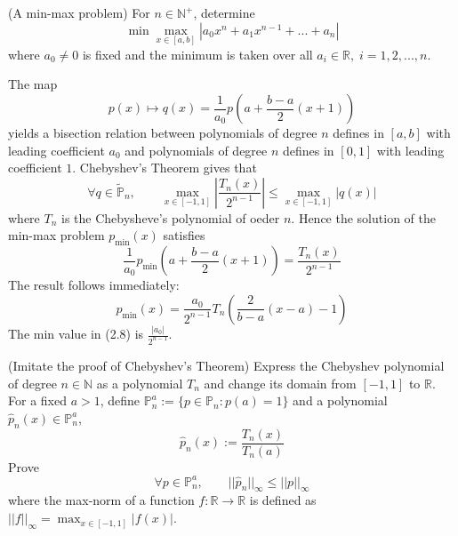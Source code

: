 \documentclass[11pt]{elegantbook}
\begin{document}
\vspace{1.5em}

\begin{problem}
  (A min-max problem) For $n\in\mathbb{N}^+$, determine
  \begin{equation}
    \min \max_{x\in[a,b]} |a_0x^n+a_1x^{n-1}+...+a_n|
  \end{equation}
  where $a_0\neq 0$ is fixed and the minimum is taken over all $a_i\in\mathbb{R},\;i=1,2,...,n$.
\end{problem}

\begin{solution}
  The map
  \begin{equation*}
    p(x) \mapsto q(x)=\frac{1}{a_0}p\left(a+\frac{b-a}{2}(x+1)\right)
  \end{equation*}
  yields a bisection relation between polynomials of degree $n$ defines in $[a,b]$ with leading coefficient $a_0$ and polynomials of degree $n$ defines in $[0,1]$ with leading coefficient $1$. Chebyshev's Theorem gives that
  \begin{equation*}
    \forall q\in \tilde{\mathbb{P}}_n, \qquad \max_{x\in[-1,1]} \left|\frac{T_n(x)}{2^{n-1}}\right|\leq \max_{x\in[-1,1]} |q(x)|
  \end{equation*}
  where $T_n$ is the Chebysheve's polynomial of oeder $n$. Hence the solution of the min-max problem $p_\text{min}(x)$ satisfies
  \begin{equation*}
    \frac{1}{a_0}p_\text{min}\left(a+\frac{b-a}{2}(x+1)\right)=\frac{T_n(x)}{2^{n-1}}
  \end{equation*}
  The result follows immediately:
  \begin{equation*}
    p_\text{min}(x)=\frac{a_0}{2^{n-1}}T_n\left(\frac{2}{b-a}(x-a)-1\right)
  \end{equation*}
  The min value in (2.8) is $\frac{|a_0|}{2^{n-1}}$.
\end{solution}

\begin{problem}
  (Imitate the proof of Chebyshev's Theorem) Express the Chebyshev polynomial of degree $n\in\mathbb{N}$ as a polynomial $T_n$ and change its domain from $[-1,1]$ to $\mathbb{R}$. For a fixed $a>1$, define $\mathbb{P}_n^a := \{p\in\mathbb{P}_n:p(a)=1\}$ and a polynomial $\hat{p}_n(x)\in\mathbb{P}_n^a$,
  \begin{equation*}
    \hat{p}_n(x) := \frac{T_n(x)}{T_n(a)}
  \end{equation*}
  Prove
  \begin{equation*}
    \forall p\in \mathbb{P}_n^a,\qquad ||\hat{p}_n||_\infty \leq ||p||_\infty
  \end{equation*}
  where the max-norm of a function $f:\mathbb{R}\to\mathbb{R}$ is defined as $||f||_\infty = \max_{x\in[-1,1]}|f(x)|$.
\end{problem}
\end{document}
